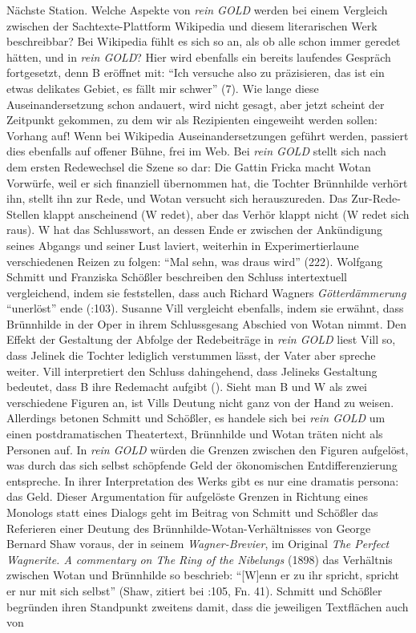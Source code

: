 \documentclass[fontsize=12pt]{scrartcl}
\begin{document}
N\"achste Station. Welche Aspekte von \textit{rein GOLD} werden bei einem Vergleich zwi\-schen der Sachtexte-Plattform Wi\-ki\-pe\-dia und diesem li\-te\-ra\-rischen Werk beschreibbar? Bei Wi\-ki\-pe\-dia f\"uhlt es sich so an, als ob alle schon immer geredet h\"atten, und in \textit{rein GOLD}? \mbox{Hier} wird ebenfalls ein bereits laufendes Gespr\"ach fort\-ge\-setzt, denn B er\"offnet mit: "`Ich versuche also zu pr\"azisieren, das ist ein etwas delikates Gebiet, es f\"allt mir schwer"' (7). Wie lange diese Auseinandersetzung schon andauert, wird nicht gesagt, aber jetzt scheint der Zeitpunkt gekommen, zu dem wir als Rezipienten\textsuperscript{\tiny *} eingeweiht werden sollen: Vorhang auf! Wenn bei Wi\-ki\-pe\-dia Aus\-ein\-andersetzungen gef\"uhrt werden, passiert dies ebenfalls auf offener B\"uhne, frei im Web. Bei \textit{rein GOLD} stellt sich nach dem ersten Redewechsel die Szene so dar: Die Gattin Fricka macht Wotan Vorw\"urfe, weil er sich finanziell \"ubernommen hat, die Tochter Br\"unnhilde verh\"ort ihn, stellt ihn zur Rede, und Wotan versucht sich he\-rauszureden. Das Zur-Rede-Stellen klappt anscheinend (W redet), aber das Verh\"or klappt nicht (W redet sich raus). W hat das Schlusswort, an dessen Ende er zwischen der Ank\"undigung seines Abgangs und seiner Lust laviert, weiterhin in Experimertierlaune verschiedenen Reizen zu folgen: "`Mal sehn, was draus wird"' (222). Wolfgang Schmitt und Franziska Sch\"o{\ss}ler beschrei\-ben den Schluss intertextuell vergleichend, indem sie feststellen, dass auch Richard Wagners \textit{G\"otterd\"ammerung} "`unerl\"ost"' ende (\cite{SchmittSchossler2013}:103). Susanne Vill vergleicht ebenfalls, indem sie erw\"ahnt, dass Br\"unnhilde in der Oper in ihrem Schlussgesang Abschied von Wotan nimmt. Den Effekt der Gestaltung der Abfolge der Redebeitr\"age in \textit{rein GOLD} liest Vill so, dass Jelinek die Tochter lediglich verstummen l\"asst, der Vater aber spreche weiter. Vill interpretiert den Schluss dahingehend, dass Jelineks Gestaltung bedeutet, dass B ihre Redemacht aufgibt (\cite{Vill2013}). Sieht man B und W als zwei verschiedene Figuren an, ist Vills Deutung nicht ganz von der Hand zu weisen. Al\-ler\-dings betonen Schmitt und Sch\"o{\ss}ler, es handele sich bei \textit{rein GOLD} um einen postdramatischen Theatertext, Br\"unnhilde und Wotan tr\"aten nicht als Per\-so\-nen auf. In \textit{rein GOLD} w\"urden die Grenzen zwischen den Figuren aufgel\"ost, was durch das sich \mbox{selbst} sch\"opfende Geld der \"okonomischen Entdifferenzierung entspreche. In ihrer Interpretation des Werks gibt es nur eine dramatis persona: das Geld. Dieser Argumentation f\"ur aufgel\"oste Grenzen in Richtung eines Monologs statt eines Dialogs geht im Beitrag von Schmitt und Sch\"o{\ss}ler das Referieren einer Deutung des Br\"unnhilde-Wotan-Verh\"altnisses von George Bernard Shaw voraus, der in seinem \textit{Wagner-Brevier}, im Original \textit{The Perfect Wagnerite. A commentary on The Ring of the Nibelungs} (1898) das Verh\"altnis zwi\-schen Wotan und Br\"unnhilde so beschrieb: "`[W]enn er zu ihr spricht, spricht er nur mit sich \mbox{selbst}"' (Shaw, zitiert bei \cite{SchmittSchossler2013}:105, Fn. 41). Schmitt und Sch\"o{\ss}ler begr\"unden ihren Standpunkt zwei\-tens damit, dass die je\-wei\-li\-gen Textfl\"achen auch von 
\end{document}
